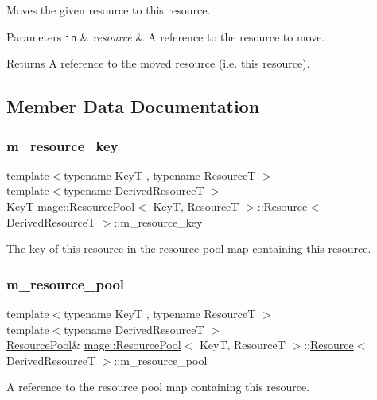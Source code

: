 Moves the given resource to this resource.


\begin{DoxyParams}[1]{Parameters}
\mbox{\tt in}  & {\em resource} & A reference to the resource to move. \\
\hline
\end{DoxyParams}
\begin{DoxyReturn}{Returns}
A reference to the moved resource (i.\+e. this resource). 
\end{DoxyReturn}


\subsection{Member Data Documentation}
\hypertarget{classmage_1_1_resource_pool_1_1_resource_a7200f97a65becde72367c9d0e3641621}{}\label{classmage_1_1_resource_pool_1_1_resource_a7200f97a65becde72367c9d0e3641621} 
\subsubsection{\texorpdfstring{m\+\_\+resource\+\_\+key}{m\_resource\_key}}
{\footnotesize\ttfamily template$<$typename KeyT , typename ResourceT $>$ \\
template$<$typename Derived\+ResourceT $>$ \\
KeyT \hyperlink{classmage_1_1_resource_pool}{mage\+::\+Resource\+Pool}$<$ KeyT, ResourceT $>$\+::\hyperlink{classmage_1_1_resource_pool_1_1_resource}{Resource}$<$ Derived\+ResourceT $>$\+::m\+\_\+resource\+\_\+key\hspace{0.3cm}{\ttfamily [private]}}

The key of this resource in the resource pool map containing this resource. \hypertarget{classmage_1_1_resource_pool_1_1_resource_a9e5b68fd638ed6bd3b271afff834aced}{}\label{classmage_1_1_resource_pool_1_1_resource_a9e5b68fd638ed6bd3b271afff834aced} 
\subsubsection{\texorpdfstring{m\+\_\+resource\+\_\+pool}{m\_resource\_pool}}
{\footnotesize\ttfamily template$<$typename KeyT , typename ResourceT $>$ \\
template$<$typename Derived\+ResourceT $>$ \\
\hyperlink{classmage_1_1_resource_pool}{Resource\+Pool}\& \hyperlink{classmage_1_1_resource_pool}{mage\+::\+Resource\+Pool}$<$ KeyT, ResourceT $>$\+::\hyperlink{classmage_1_1_resource_pool_1_1_resource}{Resource}$<$ Derived\+ResourceT $>$\+::m\+\_\+resource\+\_\+pool\hspace{0.3cm}{\ttfamily [private]}}

A reference to the resource pool map containing this resource. 